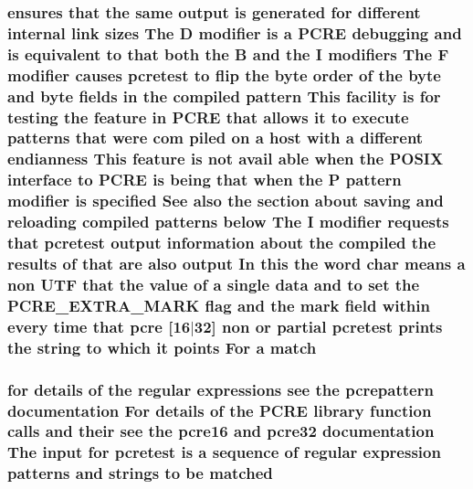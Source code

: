 \subsubsection[{\texorpdfstring{match}{match}}]{ ensures that the same {\bf output} {\bf is} {\bf generated} for different internal link sizes The {\bf D} {\bf modifier} {\bf is} {\bf a} {\bf P\+C\+RE} debugging and {\bf is} equivalent {\bf to} that both the {\bf B} and the {\bf I} {\bf modifiers} The {\bf F} {\bf modifier} causes {\bf pcretest} {\bf to} flip the byte {\bf order} {\bf of} the byte and byte {\bf fields} {\bf in} the {\bf compiled} {\bf pattern} This {\bf facility} {\bf is} for testing the {\bf feature} {\bf in} {\bf P\+C\+RE} that allows {\bf it} {\bf to} execute {\bf patterns} that were com piled {\bf on} {\bf a} {\bf host} {\bf with} {\bf a} different endianness This {\bf feature} {\bf is} {\bf not} avail {\bf able} when the P\+O\+S\+IX interface {\bf to} {\bf P\+C\+RE} {\bf is} being that when the P {\bf pattern} {\bf modifier} {\bf is} {\bf specified} See also the {\bf section} about saving and reloading {\bf compiled} {\bf patterns} {\bf below} The {\bf I} {\bf modifier} {\bf requests} that {\bf pcretest} {\bf output} information about the {\bf compiled} the {\bf results} {\bf of} that {\bf are} also {\bf output} In {\bf this} the {\bf word} char means {\bf a} non U\+TF that the {\bf value} {\bf of} {\bf a} single {\bf data} and {\bf to} {\bf set} the {\bf P\+C\+R\+E\+\_\+\+E\+X\+T\+R\+A\+\_\+\+M\+A\+RK} {\bf flag} and the {\bf mark} {\bf field} within every {\bf time} that {\bf pcre} \mbox{[}16$\vert$32\mbox{]} non {\bf or} {\bf partial} {\bf pcretest} prints the {\bf string} {\bf to} {\bf which} {\bf it} points For {\bf a} match}\hypertarget{pcretest_8txt_a1ab83e1744c899bdc46fd2515a88c3b6}{}\label{pcretest_8txt_a1ab83e1744c899bdc46fd2515a88c3b6}
\subsubsection[{\texorpdfstring{matched}{matched}}]{\setlength{\rightskip}{0pt plus 5cm}for {\bf details} {\bf of} the regular {\bf expressions} see the {\bf pcrepattern} {\bf documentation} For {\bf details} {\bf of} the {\bf P\+C\+RE} {\bf library} {\bf function} {\bf calls} and their see the {\bf pcre16} and {\bf pcre32} {\bf documentation} The {\bf input} for {\bf pcretest} {\bf is} {\bf a} {\bf sequence} {\bf of} regular {\bf expression} {\bf patterns} and {\bf strings} {\bf to} {\bf be} matched}\hypertarget{pcretest_8txt_a985aa1fe4c6d3087c88885247d1cf9d7}{}\label{pcretest_8txt_a985aa1fe4c6d3087c88885247d1cf9d7}
